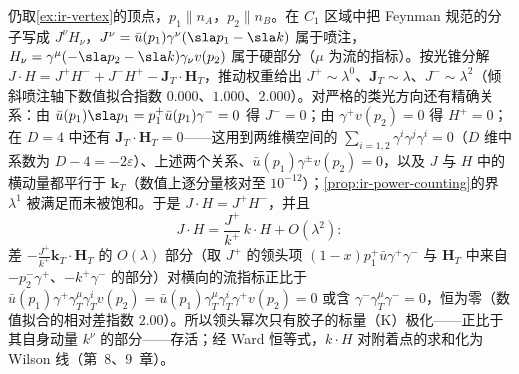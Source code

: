 \begin{example}\label{ex:ir-k-dominance}
仍取\cref{ex:ir-vertex}的顶点，$p_1\parallel n_A$，$p_2\parallel n_B$。在 $C_1$ 区域中把 Feynman 规范的分子写成 $J^\nu H_\nu$，$J^\nu=\bar u(p_1)\gamma^\nu(\sla p_1-\sla k)$ 属于喷注，$H_\nu=\gamma^\mu(-\sla p_2-\sla k)\gamma_\nu v(p_2)$ 属于硬部分（$\mu$ 为流的指标）。按光锥分解 $J\cdot H=J^+H^-+J^-H^+-\mathbf J_T\cdot\mathbf H_T$，推动权重给出 $J^+\sim\lambda^0$、$\mathbf J_T\sim\lambda$、$J^-\sim\lambda^2$（倾斜喷注轴下数值拟合指数 $0.000$、$1.000$、$2.000$）。对严格的类光方向还有精确关系：由 $\bar u(p_1)\sla p_1=p_1^+\bar u(p_1)\gamma^-=0$ 得 $J^-=0$；由 $\gamma^+v(p_2)=0$ 得 $H^+=0$；在 $D=4$ 中还有 $\mathbf J_T\cdot\mathbf H_T=0$——这用到两维横空间的 $\sum_{i=1,2}\gamma^i\gamma^j\gamma^i=0$（$D$ 维中系数为 $D-4=-2\varepsilon$）、上述两个关系、$\bar u(p_1)\gamma^\pm v(p_2)=0$，以及 $J$ 与 $H$ 中的横动量都平行于 $\mathbf k_T$（数值上逐分量核对至 $10^{-12}$）；\cref{prop:ir-power-counting}的界 $\lambda^1$ 被满足而未被饱和。于是 $J\cdot H=J^+H^-$，并且
\begin{equation}\label{eq:ir-k-dominance}
J\cdot H=\frac{J^+}{k^+}\,k\cdot H+O(\lambda^2):
\end{equation}
差 $-\frac{J^+}{k^+}\mathbf k_T\cdot\mathbf H_T$ 的 $O(\lambda)$ 部分（取 $J^+$ 的领头项 $(1-x)p_1^+\bar u\gamma^+\gamma^-$ 与 $\mathbf H_T$ 中来自 $-p_2^-\gamma^+$、$-k^+\gamma^-$ 的部分）对横向的流指标正比于 $\bar u(p_1)\gamma^+\gamma_T^\mu\gamma_T^iv(p_2)=\bar u(p_1)\gamma_T^\mu\gamma_T^i\gamma^+v(p_2)=0$ 或含 $\gamma^-\gamma_T^\mu\gamma^-=0$，恒为零（数值拟合的相对差指数 $2.00$）。所以领头幂次只有胶子的标量（K）极化——正比于其自身动量 $k^\nu$ 的部分——存活；经 Ward 恒等式，$k\cdot H$ 对附着点的求和化为 Wilson 线（第~8、9~章）。
\end{example}

